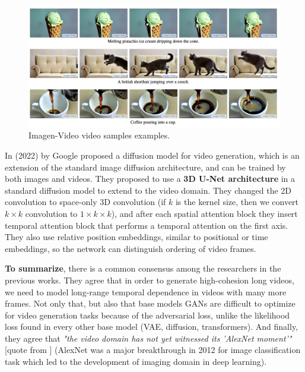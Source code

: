 \begin{figure}
    \centering
    \includegraphics[width=1\textwidth]{images/video_synthesis/imagen_video.png}
    \caption{Imagen-Video video samples examples.}
\end{figure}

In \cite{video_diffusion_models} (2022) by Google proposed a diffusion model for video generation, which is an extension of the standard image diffusion architecture, and can be trained by both images and videos. They proposed to use a \textbf{3D U-Net architecture} in a standard diffusion model to extend to the video domain. They changed the 2D convolution to space-only 3D convolution (if $k$ is the kernel size, then we convert $k\times k$ convolution to $1\times k\times k$), and after each spatial attention block they insert temporal attention block that performs a temporal attention on the first axis. They also use relative position embeddings, similar to positional or time embeddings, so the network can distinguish ordering of video frames.

\textbf{To summarize}, there is a common consensus among the researchers in the previous works. They agree that in order to generate high-cohesion long videos, we need to model long-range temporal dependence in videos with many more frames. Not only that, but also that base models GANs are difficult to optimize for video generation tasks because of the adversarial loss, unlike the likelihood loss found in every other base model (VAE, diffusion, transformers). And finally, they agree that \textit{"the video domain has not yet witnessed its 'AlexNet moment'"} [quote from \cite{tran2018closer}] (AlexNet \cite{alexnet} was a major breakthrough in 2012 for image classification task which led to the development of imaging domain in deep learning). 






